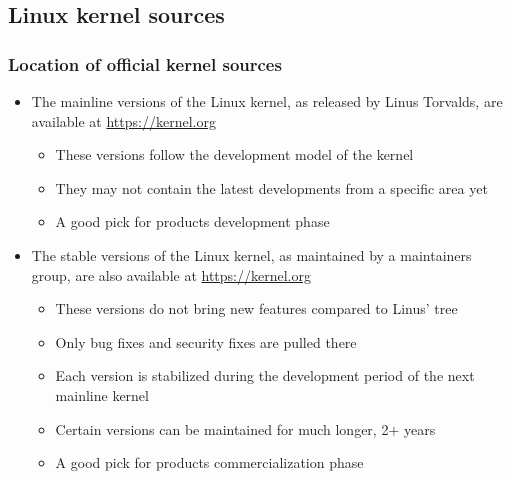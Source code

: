 \subsection{Linux kernel sources}

\begin{frame}
  \frametitle{Location of official kernel sources}
  \begin{itemize}
  \item The mainline versions of the Linux kernel, as released by Linus
    Torvalds, are available at \url{https://kernel.org}
    \begin{itemize}
    \item These versions follow the development model of the kernel
    \item They may not contain the latest developments from a specific
      area yet
    \item A good pick for products development phase
    \end{itemize}
    \item The stable versions of the Linux kernel, as maintained by a
      maintainers group, are also available at \url{https://kernel.org}
    \begin{itemize}
    \item These versions do not bring new features compared to Linus'
      tree
    \item Only bug fixes and security fixes are pulled there
    \item Each version is stabilized during the development period of
      the next mainline kernel
    \item Certain versions can be maintained for much longer, 2$+$ years
    \item A good pick for products commercialization phase
    \end{itemize}
  \end{itemize}
\end{frame}

